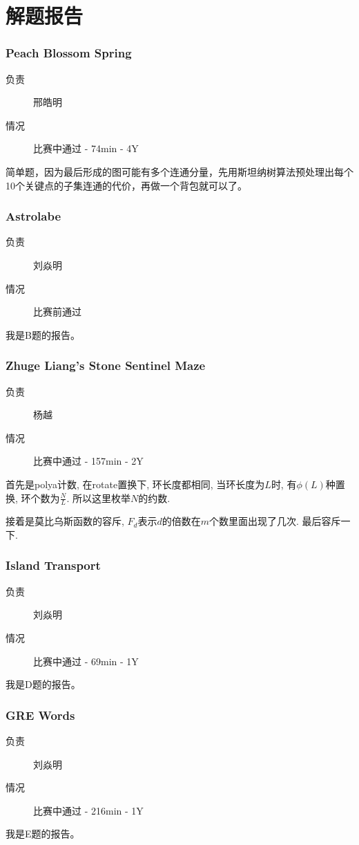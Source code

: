 \documentclass[a4paper, 11pt, nofonts, nocap, fancyhdr]{ctexart}
\newcommand{\problem}[1]{\subsubsection{#1}}
\begin{document}
\section{解题报告}


\problem{Peach Blossom Spring}

\begin{description}
\item[负责] 邢皓明
\item[情况] 比赛中通过 - 74min - 4Y
\end{description}

简单题，因为最后形成的图可能有多个连通分量，先用斯坦纳树算法预处理出每个10个关键点的子集连通的代价，再做一个背包就可以了。

\problem{Astrolabe}

\begin{description}
\item[负责] 刘焱明
\item[情况] 比赛前通过
\end{description}

我是B题的报告。

\problem{Zhuge Liang's Stone Sentinel Maze}

\begin{description}
\item[负责] 杨越
\item[情况] 比赛中通过 - 157min - 2Y
\end{description}

首先是polya计数, 在rotate置换下, 环长度都相同, 当环长度为$L$时, 有$\phi(L)$种置换, 环个数为$\frac{N}{L}$. 所以这里枚举$N$的约数.

接着是莫比乌斯函数的容斥, $F_d$表示$d$的倍数在$m$个数里面出现了几次. 最后容斥一下.

\problem{Island Transport}

\begin{description}
\item[负责] 刘焱明
\item[情况] 比赛中通过 - 69min - 1Y
\end{description}

我是D题的报告。

\problem{GRE Words}

\begin{description}
\item[负责] 刘焱明
\item[情况] 比赛中通过 - 216min - 1Y
\end{description}

我是E题的报告。
\end{document}
